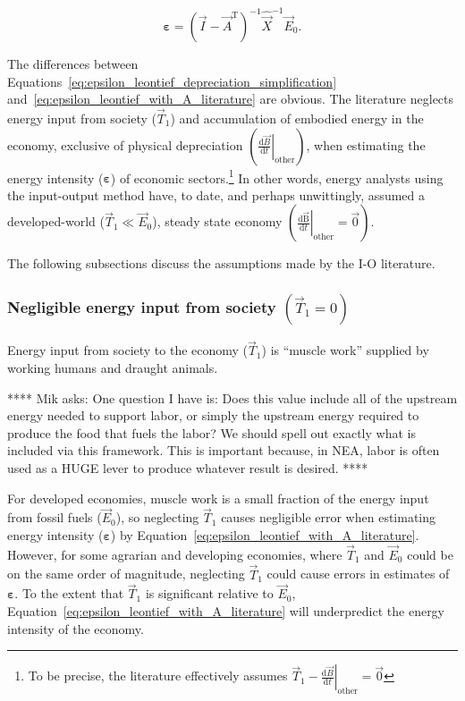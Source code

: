 \begin{equation} \label{eq:epsilon_leontief_with_A_literature}
	\bm{\varepsilon} 
	= {(\vec{I} - \vec{A}^{\mathrm{T}})}^{-1}
	\hat{\vec{X}}^{-1}
	\vec{E}_{0}.
\end{equation}

The differences between Equations~\ref{eq:epsilon_leontief_depreciation_simplification}
and~\ref{eq:epsilon_leontief_with_A_literature} are obvious. 
The literature neglects
energy input from society ($\vec{T}_{1}$)
and accumulation of embodied energy in the economy,
exclusive of physical depreciation 
$\left( \left. \frac{\mathrm{d}\vec{B}}{\mathrm{d}t} \right|_{\mathrm{other}} \right)$,
when estimating the energy intensity ($\bm{\varepsilon}$) 
of economic sectors.\footnote{To be precise, 
the literature effectively assumes
$
	\vec{T}_{1}
	- \left. \frac{\mathrm{d}\vec{B}}{\mathrm{d}t} \right|_{\mathrm{other}}
	= \vec{0}
$}
In other words, energy analysts using the input-output method
have, to date, and perhaps unwittingly, assumed 
a developed-world ($\vec{T}_{1} \ll \vec{E}_{0}$), 
steady state economy
$\left( \left. \frac{\mathrm{d}\mathrm{\vec{B}}}{\mathrm{d}t} \right|_{\mathrm{other}} 
= \vec{0} \right)$.

The following subsections discuss the assumptions made by the I-O literature.


\subsubsection{Negligible energy input from society $\left( \vec{T}_{1} = 0 \right)$}

Energy input from society to the economy ($\vec{T}_{1}$)
is ``muscle work'' supplied by working humans 
and draught animals.\cite{Ayres:2003ec,Ayres:2010ug,Warr:2012cg} 

**** Mik asks: One question I have is:
Does this value include all of the upstream energy needed to support labor, 
or simply the upstream energy required to produce the food that fuels the labor?
We should spell out exactly what is included via this framework. 
This is important because, in NEA, labor is often used 
as a HUGE lever to produce whatever result is desired.
****

For developed economies, muscle work is a small fraction
of the energy input from fossil fuels ($\vec{E}_{0}$),
so neglecting $\vec{T}_{1}$ causes negligible error when
estimating energy intensity ($\bm{\varepsilon}$) by
Equation~\ref{eq:epsilon_leontief_with_A_literature}.
However, for some agrarian 
and developing economies, 
where $\vec{T}_{1}$ and $\vec{E}_{0}$ 
could be on the same order of magnitude,
neglecting $\vec{T}_{1}$ could cause errors
in estimates of $\bm{\varepsilon}$.
To the extent that $\vec{T}_{1}$ 
is significant relative to $\vec{E}_{0}$,
Equation~\ref{eq:epsilon_leontief_with_A_literature}
will underpredict the energy intensity of the economy.

